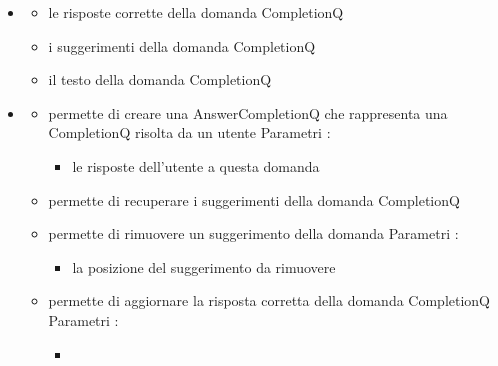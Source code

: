 \begin{itemize}
\item {}
\begin{itemize}
\item {}
\newline
le risposte corrette della domanda CompletionQ
\item {}
\newline
i suggerimenti della domanda CompletionQ
\item {}
\newline
il testo della domanda CompletionQ
\end{itemize}
\item {}
\begin{itemize}
\item {}
\newline
permette di creare una AnswerCompletionQ che rappresenta una CompletionQ risolta da un utente
\newline
Parametri :
\begin{itemize}
\item {}
\newline
le risposte dell'utente a questa domanda
\end{itemize}
\item {}
\newline
permette di recuperare i suggerimenti della domanda CompletionQ
\newline
\item {}
\newline
permette di rimuovere un suggerimento della domanda
\newline
Parametri :
\begin{itemize}
\item {}
\newline
la posizione del suggerimento da rimuovere
\end{itemize}
\item {}
\newline
permette di aggiornare la risposta corretta della domanda CompletionQ
\newline
Parametri :
\begin{itemize}
\item {}

\end{itemize}
\end{itemize}
\end{itemize}
